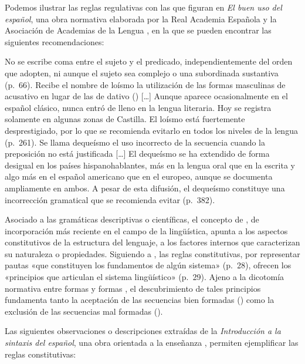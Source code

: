 Podemos ilustrar las reglas regulativas con las que figuran en \textit{El buen
uso del español}, una obra normativa elaborada por la Real Academia Española y
la Asociación de Academias de la Lengua \parencite{rae2013}, en la que se
pueden encontrar las siguientes recomendaciones:

\begin{exe}
  \ex\label{ex:02-coma} No se escribe coma entre el sujeto y el predicado,
      independientemente del orden que adopten, ni aunque el sujeto sea
      complejo o una subordinada sustantiva (p.~66).
  \ex\label{ex:02-loismo} Recibe el nombre de loísmo la utilización de las
      formas masculinas de acusativo  en lugar de las de dativo
      () [\ldots] Aunque aparece ocasionalmente en el español
      clásico, nunca entró de lleno en la lengua literaria. Hoy se registra
      solamente en algunas zonas de Castilla. El loísmo está fuertemente
      desprestigiado, por lo que se recomienda evitarlo en todos los niveles de
      la lengua (p.~261).
  \ex\label{ex:02-dequeismo} Se llama dequeísmo el uso incorrecto de la
      secuencia  cuando la preposición  no está
      justificada [\ldots] El dequeísmo se ha extendido de forma desigual en
      los países hispanohablantes, más en la lengua oral que en la escrita y
      algo más en el español americano que en el europeo, aunque se documenta
      ampliamente en ambos. A pesar de esta difusión, el dequeísmo constituye
      una incorrección gramatical que se recomienda evitar (p.~382).
\end{exe}

Asociado a las gramáticas descriptivas o científicas, el concepto de
, de incorporación más reciente en el campo de la
lingüística, apunta a los aspectos constitutivos de la estructura del lenguaje,
a los factores internos que caracterizan su naturaleza o propiedades. Siguiendo
a \textcite{bosque2009}, las reglas constitutivas, por representar pautas «que
constituyen los fundamentos de algún sistema» (p.~28), ofrecen los «principios
que articulan el sistema lingüístico» (p.~29). Ajeno a la dicotomía normativa
entre formas  y formas , el
descubrimiento de tales principios fundamenta tanto la aceptación de las
secuencias bien formadas () como la exclusión de las
secuencias mal formadas ().

Las siguientes observaciones o descripciones extraídas de la
\textit{Introducción a la sintaxis del español}, una obra orientada a la
enseñanza \parencite{camacho2018}, permiten ejemplificar las reglas
constitutivas:


